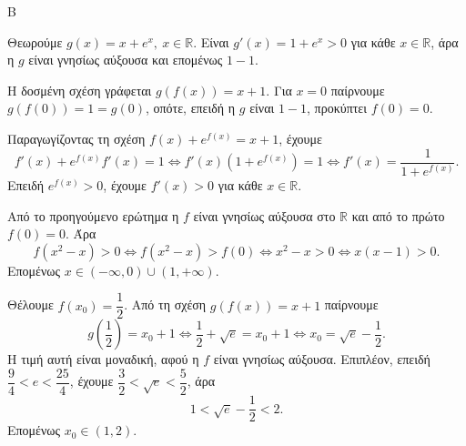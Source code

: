 
\begin{thema}{Β}
\begin{erwthma}
\item Θεωρούμε $g(x)=x+e^x,\ x\in\mathbb{R}$. Είναι $g'(x)=1+e^x>0$ για κάθε $x\in\mathbb{R}$, άρα η $g$ είναι γνησίως αύξουσα και επομένως $1-1$.

Η δοσμένη σχέση γράφεται $g(f(x))=x+1$. Για $x=0$ παίρνουμε $g(f(0))=1=g(0)$, οπότε, επειδή η $g$ είναι $1-1$, προκύπτει $f(0)=0$.

\item Παραγωγίζοντας τη σχέση $f(x)+e^{f(x)}=x+1$, έχουμε
\[
f'(x)+e^{f(x)}f'(x)=1\Leftrightarrow f'(x)\left(1+e^{f(x)}\right)=1
\Leftrightarrow f'(x)=\frac{1}{1+e^{f(x)}}.
\]
Επειδή $e^{f(x)}>0$, έχουμε $f'(x)>0$ για κάθε $x\in\mathbb{R}$.

\item Από το προηγούμενο ερώτημα η $f$ είναι γνησίως αύξουσα στο $\mathbb{R}$ και από το πρώτο $f(0)=0$. Άρα
\[
f(x^2-x)>0\Leftrightarrow f(x^2-x)>f(0)\Leftrightarrow x^2-x>0
\Leftrightarrow x(x-1)>0.
\]
Επομένως $x\in(-\infty,0)\cup(1,+\infty)$.

\item Θέλουμε $f(x_0)=\dfrac12$. Από τη σχέση $g(f(x))=x+1$ παίρνουμε
\[
g\left(\frac12\right)=x_0+1\Leftrightarrow \frac12+\sqrt{e}=x_0+1
\Leftrightarrow x_0=\sqrt{e}-\frac12.
\]
Η τιμή αυτή είναι μοναδική, αφού η $f$ είναι γνησίως αύξουσα. Επιπλέον, επειδή $\dfrac94<e<\dfrac{25}{4}$, έχουμε $\dfrac32<\sqrt e<\dfrac52$, άρα
\[
1<\sqrt e-\frac12<2.
\]
Επομένως $x_0\in(1,2)$.
\end{erwthma}
\end{thema}



